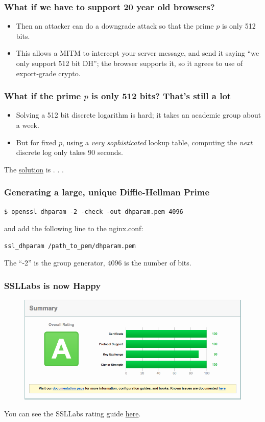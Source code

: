 \documentclass[9pt]{beamer}
\begin{document}
\begin{frame}[fragile]
\frametitle{What if we have to support 20 year old browsers?}
\begin{itemize}
\item Then an attacker can do a downgrade attack so that the prime $p$ is only 512 bits.
\pause
\item This allows a MITM to intercept your server message, and send it saying ``we only support 512 bit DH''; the browser supports it, so it agrees to use of export-grade crypto.
\end{itemize}
\end{frame}

\begin{frame}[fragile]
\frametitle{What if the prime $p$ is only 512 bits? That's still a lot}
\begin{itemize}
\item Solving a 512 bit discrete logarithm is hard; it takes an academic group about a week.
\pause
\item But for fixed $p$, using a \emph{very sophisticated} lookup table, computing the \emph{next} discrete log only takes 90 seconds.
\pause
\end{itemize}
The \href{https://weakdh.org/sysadmin.html}{solution} is . . .
\end{frame}

\begin{frame}[fragile]
\frametitle{Generating a large, unique Diffie-Hellman Prime}
\begin{verbatim}
$ openssl dhparam -2 -check -out dhparam.pem 4096
\end{verbatim}
and add the following line to the nginx.conf:
\begin{verbatim}
ssl_dhparam /path_to_pem/dhparam.pem
\end{verbatim}
The ``-2'' is the group generator, 4096 is the number of bits.
\end{frame}

\begin{frame}[fragile]
\frametitle{SSLLabs is now Happy}
\begin{figure}
\includegraphics[scale=0.25]{figures/SSLLabsA.png}
\end{figure}
You can see the SSLLabs rating guide \href{https://www.ssllabs.com/downloads/SSL_Server_Rating_Guide.pdf}{here}.
\end{frame}
\end{document}
